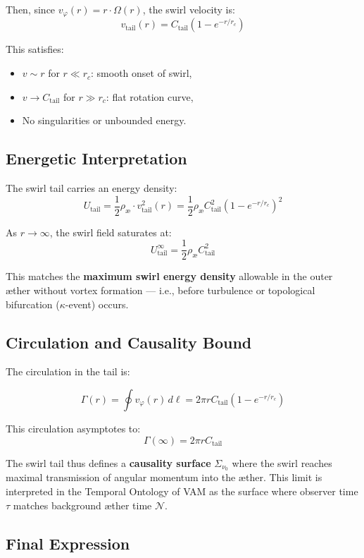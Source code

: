 \documentclass[12pt]{article}
\begin{document}
Then, since \( v_\varphi(r) = r \cdot \Omega(r) \), the swirl velocity is:
\[
v_\text{tail}(r) = C_{\text{tail}} \left(1 - e^{-r/r_c} \right)
\]

This satisfies:
\begin{itemize}
    \item \( v \sim r \) for \( r \ll r_c \): smooth onset of swirl,
    \item \( v \to C_{\text{tail}} \) for \( r \gg r_c \): flat rotation curve,
    \item No singularities or unbounded energy.
\end{itemize}

\subsection{Energetic Interpretation}

The swirl tail carries an energy density:
\[
U_{\text{tail}} = \frac{1}{2} \rho_{\text{\ae}} \cdot v_\text{tail}^2(r)
= \frac{1}{2} \rho_{\text{\ae}} C_{\text{tail}}^2 \left(1 - e^{-r/r_c} \right)^2
\]

As \( r \to \infty \), the swirl field saturates at:
\[
U_{\text{tail}}^\infty = \frac{1}{2} \rho_{\text{\ae}} C_{\text{tail}}^2
\]

This matches the \textbf{maximum swirl energy density} allowable in the outer æther without vortex formation — i.e., before turbulence or topological bifurcation (\( \kappa \)-event) occurs.

\subsection{Circulation and Causality Bound}

The circulation in the tail is:

\[
\Gamma(r) = \oint v_\varphi(r) \, d\ell = 2\pi r C_{\text{tail}} (1 - e^{-r/r_c})
\]

This circulation asymptotes to:
\[
\Gamma(\infty) = 2\pi r C_{\text{tail}}
\]

The swirl tail thus defines a \textbf{causality surface} \( \Sigma_{\nu_0} \) where the swirl reaches maximal transmission of angular momentum into the æther. This limit is interpreted in the Temporal Ontology of VAM as the surface where observer time \( \tau \) matches background æther time \( \mathcal{N} \).

\subsection{Final Expression}
\end{document}
